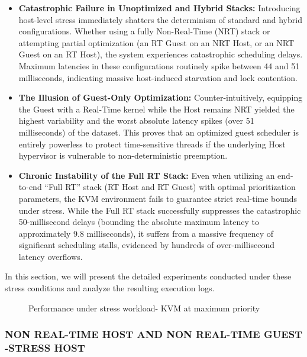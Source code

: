 \begin{itemize}
\item
  \textbf{Catastrophic Failure in Unoptimized and Hybrid Stacks:}
  Introducing host-level stress immediately shatters the determinism of
  standard and hybrid configurations. Whether using a fully
  Non-Real-Time (NRT) stack or attempting partial optimization (an RT
  Guest on an NRT Host, or an NRT Guest on an RT Host), the system
  experiences catastrophic scheduling delays. Maximum latencies in these
  configurations routinely spike between 44 and 51 milliseconds,
  indicating massive host-induced starvation and lock contention.
\item
  \textbf{The Illusion of Guest-Only Optimization:} Counter-intuitively,
  equipping the Guest with a Real-Time kernel while the Host remains NRT
  yielded the highest variability and the worst absolute latency spikes
  (over 51 milliseconds) of the dataset. This proves that an optimized
  guest scheduler is entirely powerless to protect time-sensitive
  threads if the underlying Host hypervisor is vulnerable to
  non-deterministic preemption.
\item
  \textbf{Chronic Instability of the Full RT Stack:} Even when utilizing
  an end-to-end ``Full RT'' stack (RT Host and RT Guest) with optimal
  prioritization parameters, the KVM environment fails to guarantee
  strict real-time bounds under stress. While the Full RT stack
  successfully suppresses the catastrophic 50-millisecond delays
  (bounding the absolute maximum latency to approximately 9.8
  milliseconds), it suffers from a massive frequency of significant
  scheduling stalls, evidenced by hundreds of over-millisecond latency
  overflows.
\end{itemize}

In this section, we will present the detailed experiments conducted
under these stress conditions and analyze the resulting execution logs.

\begin{figure}
\centering

\caption{Performance under stress workload- KVM at maximum priority}
\end{figure}

\subsubsection{NON REAL-TIME HOST AND NON REAL-TIME GUEST -STRESS
HOST}\label{non-real-time-host-and-non-real-time-guest--stress-host}

